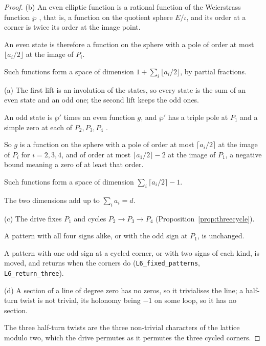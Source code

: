\documentclass[11pt,a4paper]{article}
\theoremstyle{plain}
\theoremstyle{definition}
\theoremstyle{remark}
\begin{document}
\begin{proof}
(b) An even elliptic function is a rational function of the Weierstrass function $\wp$ \cite{WhittakerWatson}, that is, a function on the quotient sphere $E/\iota$, and its order at a corner is twice its order at the image point.

An even state is therefore a function on the sphere with a pole of order at most $\lfloor a_{i}/2\rfloor$ at the image of $P_{i}$.

Such functions form a space of dimension $1+\sum_{i}\lfloor a_{i}/2\rfloor$, by partial fractions.

(a) The first lift is an involution of the states, so every state is the sum of an even state and an odd one; the second lift keeps the odd ones.

An odd state is $\wp'$ times an even function $g$, and $\wp'$ has a triple pole at $P_{1}$ and a simple zero at each of $P_{2},P_{3},P_{4}$ \cite{WhittakerWatson}.

So $g$ is a function on the sphere with a pole of order at most $\lceil a_{i}/2\rceil$ at the image of $P_{i}$ for $i=2,3,4$, and of order at most $\lceil a_{1}/2\rceil-2$ at the image of $P_{1}$, a negative bound meaning a zero of at least that order.

Such functions form a space of dimension $\sum_{i}\lceil a_{i}/2\rceil-1$.

The two dimensions add up to $\sum_{i}a_{i}=d$.

(c) The drive fixes $P_{1}$ and cycles $P_{2}\to P_{3}\to P_{4}$ (Proposition~\ref{prop:threecycle}).

A pattern with all four signs alike, or with the odd sign at $P_{1}$, is unchanged.

A pattern with one odd sign at a cycled corner, or with two signs of each kind, is moved, and returns when the corners do (\texttt{L6\_fixed\_patterns}, \texttt{L6\_return\_three}).

(d) A section of a line of degree zero has no zeros, so it trivialises the line; a half-turn twist is not trivial, its holonomy being $-1$ on some loop, so it has no section.

The three half-turn twists are the three non-trivial characters of the lattice modulo two, which the drive permutes as it permutes the three cycled corners.
\end{proof}
\end{document}

